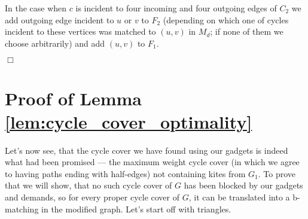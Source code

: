 \documentclass[a4, 11pt]{article}
\newcommand{\koniec}{\hfill $\Box$\\[.1ex]}
\newcommand{\<}{\langle}
\renewcommand{\>}{\rangle}
\begin{document}
In the case when $c$ is incident to four incoming and four outgoing edges of $C_2$ we add outgoing edge incident to $u$ or $v$ to $F_2$ (depending on which one of cycles incident to these vertices was matched to $(u,v)$ in $M_d$; if none of them we choose arbitrarily) and add $(u,v)$ to $F_1$.

\koniec

\section{Proof of Lemma \ref{lem:cycle_cover_optimality}}
\label{sec:c2_opt_proof}

Let's now see, that the cycle cover we have found using our gadgets is indeed
  what had been promised --- the maximum weight cycle cover (in which we agree
  to having paths ending with half-edges) not containing kites from $G_1$. To
  prove that we will show, that no such cycle cover of $G$ has been blocked by
  our gadgets and demands, so for every proper cycle cover of $G$, it can be
  translated into a b-matching in the modified graph. Let's start off with
  triangles.
\end{document}
